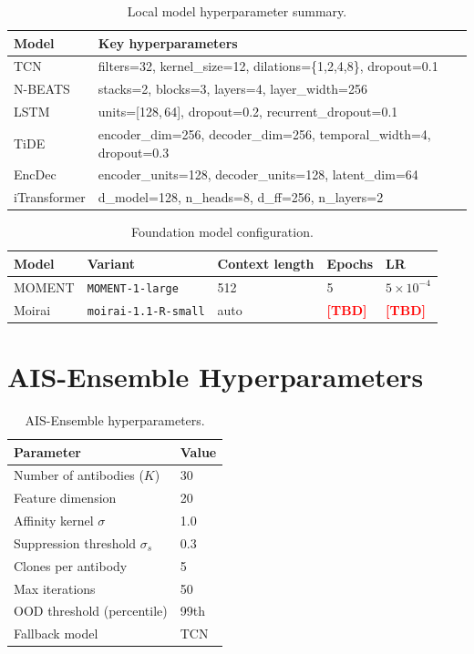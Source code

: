 \documentclass[11pt,a4paper]{article}
\newcommand{\TBD}{\textcolor{red}{\textbf{[TBD]}}}
\begin{document}
\begin{table}[H]
  \centering
  \caption{Local model hyperparameter summary.}
  \label{tab:hparams_local}
  \begin{tabular}{ll}
    \toprule
    Model & Key hyperparameters \\
    \midrule
    TCN          & filters=32, kernel\_size=12, dilations=\{1,2,4,8\}, dropout=0.1 \\
    N-BEATS      & stacks=2, blocks=3, layers=4, layer\_width=256 \\
    LSTM         & units=[128,\,64], dropout=0.2, recurrent\_dropout=0.1 \\
    TiDE         & encoder\_dim=256, decoder\_dim=256, temporal\_width=4, dropout=0.3 \\
    EncDec       & encoder\_units=128, decoder\_units=128, latent\_dim=64 \\
    iTransformer & d\_model=128, n\_heads=8, d\_ff=256, n\_layers=2 \\
    \bottomrule
  \end{tabular}
\end{table}

\begin{table}[H]
  \centering
  \caption{Foundation model configuration.}
  \label{tab:hparams_fm}
  \begin{tabular}{lllll}
    \toprule
    Model  & Variant & Context length & Epochs & LR \\
    \midrule
    MOMENT & \texttt{MOMENT-1-large}     & 512  & 5    & $5\times10^{-4}$ \\
    Moirai & \texttt{moirai-1.1-R-small} & auto & \TBD & \TBD \\
    \bottomrule
  \end{tabular}
\end{table}

\section{AIS-Ensemble Hyperparameters}

\begin{table}[H]
  \centering
  \caption{AIS-Ensemble hyperparameters.}
  \label{tab:hparams_ais}
  \begin{tabular}{ll}
    \toprule
    Parameter & Value \\
    \midrule
    Number of antibodies ($K$)    & 30 \\
    Feature dimension              & 20 \\
    Affinity kernel $\sigma$       & 1.0 \\
    Suppression threshold $\sigma_s$ & 0.3 \\
    Clones per antibody            & 5 \\
    Max iterations                 & 50 \\
    OOD threshold (percentile)     & 99th \\
    Fallback model                 & TCN \\
    \bottomrule
  \end{tabular}
\end{table}
\end{document}
